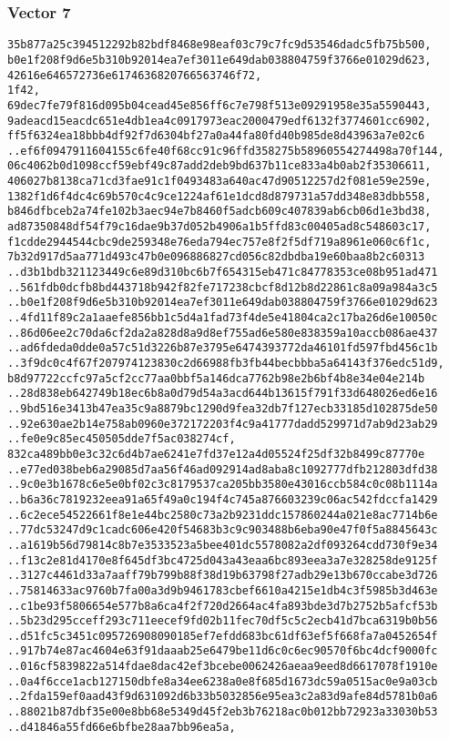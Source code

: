 \documentclass[
]{article}
\begin{document}
\hypertarget{vector-7-2}{%
\subsubsection{Vector 7}\label{vector-7-2}}

\begin{verbatim}
35b877a25c394512292b82bdf8468e98eaf03c79c7fc9d53546dadc5fb75b500,
b0e1f208f9d6e5b310b92014ea7ef3011e649dab038804759f3766e01029d623,
42616e646572736e6174636820766563746f72,
1f42,
69dec7fe79f816d095b04cead45e856ff6c7e798f513e09291958e35a5590443,
9adeacd15eacdc651e4db1ea4c0917973eac2000479edf6132f3774601cc6902,
ff5f6324ea18bbb4df92f7d6304bf27a0a44fa80fd40b985de8d43963a7e02c6
..ef6f0947911604155c6fe40f68cc91c96ffd358275b58960554274498a70f144,
06c4062b0d1098ccf59ebf49c87add2deb9bd637b11ce833a4b0ab2f35306611,
406027b8138ca71cd3fae91c1f0493483a640ac47d90512257d2f081e59e259e,
1382f1d6f4dc4c69b570c4c9ce1224af61e1dcd8d879731a57dd348e83dbb558,
b846dfbceb2a74fe102b3aec94e7b8460f5adcb609c407839ab6cb06d1e3bd38,
ad87350848df54f79c16dae9b37d052b4906a1b5ffd83c00405ad8c548603c17,
f1cdde2944544cbc9de259348e76eda794ec757e8f2f5df719a8961e060c6f1c,
7b32d917d5aa771d493c47b0e096886827cd056c82dbdba19e60baa8b2c60313
..d3b1bdb321123449c6e89d310bc6b7f654315eb471c84778353ce08b951ad471
..561fdb0dcfb8bd443718b942f82fe717238cbcf8d12b8d22861c8a09a984a3c5
..b0e1f208f9d6e5b310b92014ea7ef3011e649dab038804759f3766e01029d623
..4fd11f89c2a1aaefe856bb1c5d4a1fad73f4de5e41804ca2c17ba26d6e10050c
..86d06ee2c70da6cf2da2a828d8a9d8ef755ad6e580e838359a10accb086ae437
..ad6fdeda0dde0a57c51d3226b87e3795e6474393772da46101fd597fbd456c1b
..3f9dc0c4f67f207974123830c2d66988fb3fb44becbbba5a64143f376edc51d9,
b8d97722ccfc97a5cf2cc77aa0bbf5a146dca7762b98e2b6bf4b8e34e04e214b
..28d838eb642749b18ec6b8a0d79d54a3acd644b13615f791f33d648026ed6e16
..9bd516e3413b47ea35c9a8879bc1290d9fea32db7f127ecb33185d102875de50
..92e630ae2b14e758ab0960e372172203f4c9a41777dadd529971d7ab9d23ab29
..fe0e9c85ec450505dde7f5ac038274cf,
832ca489bb0e3c32c6d4b7ae6241e7fd37e12a4d05524f25df32b8499c87770e
..e77ed038beb6a29085d7aa56f46ad092914ad8aba8c1092777dfb212803dfd38
..9c0e3b1678c6e5e0bf02c3c8179537ca205bb3580e43016ccb584c0c08b1114a
..b6a36c7819232eea91a65f49a0c194f4c745a876603239c06ac542fdccfa1429
..6c2ece54522661f8e1e44bc2580c73a2b9231ddc157860244a021e8ac7714b6e
..77dc53247d9c1cadc606e420f54683b3c9c903488b6eba90e47f0f5a8845643c
..a1619b56d79814c8b7e3533523a5bee401dc5578082a2df093264cdd730f9e34
..f13c2e81d4170e8f645df3bc4725d043a43eaa6bc893eea3a7e328258de9125f
..3127c4461d33a7aaff79b799b88f38d19b63798f27adb29e13b670ccabe3d726
..75814633ac9760b7fa00a3d9b9461783cbef6610a4215e1db4c3f5985b3d463e
..c1be93f5806654e577b8a6ca4f2f720d2664ac4fa893bde3d7b2752b5afcf53b
..5b23d295cceff293c711eecef9fd02b11fec70df5c5c2ecb41d7bca6319b0b56
..d51fc5c3451c095726908090185ef7efdd683bc61df63ef5f668fa7a0452654f
..917b74e87ac4604e63f91daaab25e6479be11d6c0c6ec90570f6bc4dcf9000fc
..016cf5839822a514fdae8dac42ef3bcebe0062426aeaa9eed8d6617078f1910e
..0a4f6cce1acb127150dbfe8a34ee6238a0e8f685d1673dc59a0515ac0e9a03cb
..2fda159ef0aad43f9d631092d6b33b5032856e95ea3c2a83d9afe84d5781b0a6
..88021b87dbf35e00e8bb68e5349d45f2eb3b76218ac0b012bb72923a33030b53
..d41846a55fd66e6bfbe28aa7bb96ea5a,
\end{verbatim}
\end{document}
